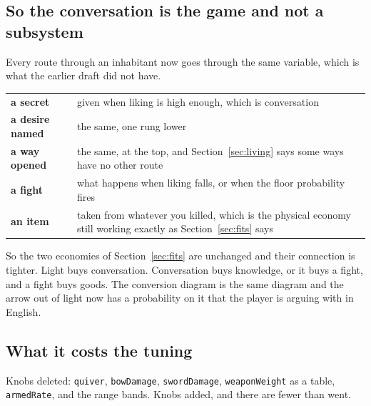\documentclass[11pt,a4paper]{article}
\begin{document}
\subsection{So the conversation is the game and not a subsystem}

Every route through an inhabitant now goes through the same variable, which is what the earlier
draft did not have.

\begin{center}
\begin{tabular}{@{}l@{\hspace{4mm}}>{\raggedright\arraybackslash}p{}@{}}
\toprule
\textbf{a secret}     & given when liking is high enough, which is conversation \\[1mm]
\textbf{a desire named} & the same, one rung lower \\[1mm]
\textbf{a way opened} & the same, at the top, and Section~\ref{sec:living} says some ways have no
other route \\[1mm]
\textbf{a fight}      & what happens when liking falls, or when the floor probability fires \\[1mm]
\textbf{an item}      & taken from whatever you killed, which is the physical economy still working
exactly as Section~\ref{sec:fits} says \\
\bottomrule
\end{tabular}
\end{center}

\begin{sectionbox}
So the two economies of Section~\ref{sec:fits} are unchanged and their connection is tighter. Light
buys conversation. Conversation buys knowledge, or it buys a fight, and a fight buys goods. The
conversion diagram is the same diagram and the arrow out of light now has a probability on it that
the player is arguing with in English.
\end{sectionbox}

\subsection{What it costs the tuning}

Knobs deleted: \texttt{quiver}, \texttt{bowDamage}, \texttt{swordDamage}, \texttt{weaponWeight} as
a table, \texttt{armedRate}, and the range bands. Knobs added, and there are fewer than went.
\end{document}
